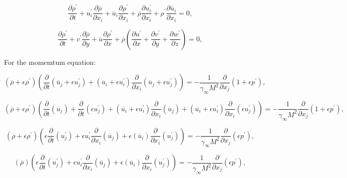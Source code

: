 \begin{equation} 
\frac{\partial\rho^{\prime}}{\partial t}
+
u_i^{\prime}
\frac{\partial \overline{\rho}}{\partial x_i} 
+
\overline{u}_i
\frac{\partial \rho^{\prime}}{\partial x_i} 
+
\overline{\rho}
\frac{\partial u^{\prime}_i}{\partial x_i}
+
\rho^{\prime}
\frac{\partial \overline{u}_i}{\partial x_i}
=
0
,
\end{equation} 

\begin{equation} 
\frac{\partial\rho^{\prime}}{\partial t}
+
v^{\prime}
\frac{\partial \overline{\rho}}{\partial y} 
+
\overline{u}
\frac{\partial \rho^{\prime}}{\partial x} 
+
\overline{\rho}
\left(
\frac{\partial u^\prime}{\partial x}
+
\frac{\partial v^\prime}{\partial y}
+
\frac{\partial w^\prime}{\partial z}
\right)
=
0
,
\end{equation} 

For the momemtum equation:


\begin{equation*} 
(\overline{\rho}+\epsilon \rho^{\prime})
\left(
\frac{\partial}{\partial t}
(\overline{u}_j+\epsilon u_j^{\prime})
+
(\overline{u}_i+\epsilon u_i^{\prime})
\frac{\partial}{\partial x_i}
(\overline{u}_j+\epsilon u_j^{\prime})
\right)
=
-
\frac{1}{\gamma_{\infty} M^{2}}
\frac{\partial }{\partial x_j} 
(1+\epsilon p^{\prime})
,
\end{equation*} 

\begin{equation*} 
(\overline{\rho}+\epsilon \rho^{\prime})
\left(
\frac{\partial}{\partial t}
(\overline{u}_j)
+
\frac{\partial}{\partial t}
(\epsilon u_j^{\prime})
+
(\overline{u}_i+\epsilon u_i^{\prime})
\frac{\partial}{\partial x_i}
(\overline{u}_j)
+
(\overline{u}_i+\epsilon u_i^{\prime})
\frac{\partial}{\partial x_i}
(\epsilon u_j^{\prime})
\right)
=
-
\frac{1}{\gamma_{\infty} M^{2}}
\frac{\partial }{\partial x_j} 
(1+\epsilon p^{\prime})
,
\end{equation*} 


\begin{equation*} 
(\overline{\rho}+\epsilon \rho^{\prime})
\left(
\epsilon
\frac{\partial}{\partial t}
( u_j^{\prime})
+
\epsilon u_i^{\prime}
\frac{\partial}{\partial x_i}
(\overline{u}_j)
+
\epsilon 
(\overline{u}_i)
\frac{\partial}{\partial x_i}
(u_j^{\prime})
\right)
=
-
\frac{1}{\gamma_{\infty} M^{2}}
\frac{\partial }{\partial x_j} 
(\epsilon p^{\prime})
,
\end{equation*} 

\begin{equation*} 
(\overline{\rho})
\left(
\epsilon
\frac{\partial}{\partial t}
( u_j^{\prime})
+
\epsilon u_i^{\prime}
\frac{\partial}{\partial x_i}
(\overline{u}_j)
+
\epsilon 
(\overline{u}_i)
\frac{\partial}{\partial x_i}
(u_j^{\prime})
\right)
=
-
\frac{1}{\gamma_{\infty} M^{2}}
\frac{\partial }{\partial x_j} 
(\epsilon p^{\prime})
,
\end{equation*} 

